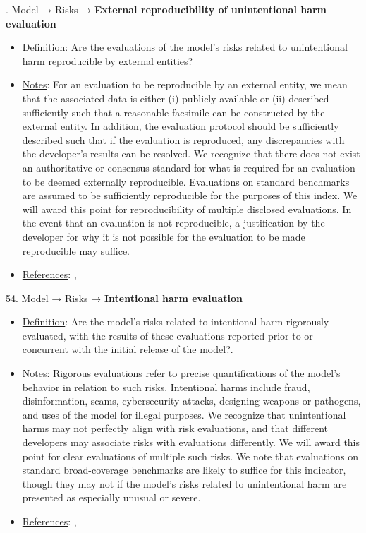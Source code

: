 . Model → Risks → \textbf{External reproducibility of unintentional harm evaluation}
\vspace{-\parskip}
\begin{itemize}
\item
\underline{Definition}: Are the evaluations of the model’s risks related to unintentional harm reproducible by external entities?
\item
\underline{Notes}: For an evaluation to be reproducible by an external entity, we mean that the associated data is either (i) publicly available or (ii) described sufficiently such that a reasonable facsimile can be constructed by the external entity. In addition, the evaluation protocol should be sufficiently described such that if the evaluation is reproduced, any discrepancies with the developer's results can be resolved. We recognize that there does not exist an authoritative or consensus standard for what is required for an evaluation to be deemed externally reproducible. Evaluations on standard benchmarks are assumed to be sufficiently reproducible for the purposes of this index. We will award this point for reproducibility of multiple disclosed evaluations. In the event that an evaluation is not reproducible, a justification by the developer for why it is not possible for the evaluation to be made reproducible may suffice.
\item
\underline{References}: \citet{kapoor2023leakage}, \citet{weidinger2021ethical}
\end{itemize} \vspace{\baselineskip}


54. Model → Risks → \textbf{Intentional harm evaluation}
\vspace{-\parskip}
\begin{itemize}
\item
\underline{Definition}: Are the model’s risks related to intentional harm rigorously evaluated, with the results of these evaluations reported prior to or concurrent with the initial release of the model?.
\item
\underline{Notes}: Rigorous evaluations refer to precise quantifications of the model's behavior in relation to such risks. Intentional harms include fraud, disinformation, scams, cybersecurity attacks, designing weapons or pathogens, and uses of the model for illegal purposes. We recognize that unintentional harms may not perfectly align with risk evaluations, and that different developers may associate risks with evaluations differently. We will award this point for clear evaluations of multiple such risks. We note that evaluations on standard broad-coverage benchmarks are likely to suffice for this indicator, though they may not if the model's risks related to unintentional harm are presented as especially unusual or severe.
\item
\underline{References}: \citet{solaiman2023evaluating}, \citet{weidinger2021ethical}
\end{itemize} \vspace{\baselineskip}


